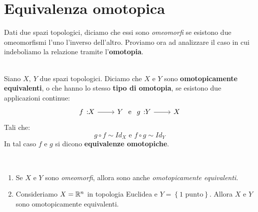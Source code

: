 \section{Equivalenza omotopica}
Dati due spazi topologici, diciamo che essi sono \textit{omeomorfi} se esistono due omeomorfismi l'uno l'inverso dell'altro. Proviamo ora ad analizzare il caso in cui indeboliamo la relazione tramite l'\textbf{omotopia}.
\begin{define}~{}\\
	Siano $X,\ Y$ due spazi topologici. Diciamo che $X$ e $Y$ sono \textbf{omotopicamente equivalenti}, o che hanno lo stesso \textbf{tipo di omotopia}, se esistono due applicazioni continue:
	\begin{equation}
		\funz{f}{X}{Y}\text{ e }\funz{g}{Y}{X}
	\end{equation}
Tali che:
\begin{equation}
	g\circ f\sim Id_X\text{ e }f\circ g\sim Id_Y
\end{equation}
In tal caso $f$ e $g$ si dicono \textbf{equivalenze omotopiche}.
\end{define}
\begin{observes}~{}
\begin{enumerate}
	\item Se $X$ e $Y$ sono \textit{omeomorfi}, allora sono anche \textit{omotopicamente equivalenti}.
	\item Consideriamo $X=\mathbb{R}^n$ in topologia Euclidea e $Y=\left\{1\text{ punto}\right\}$. Allora $X$ e $Y$ sono omotopicamente equivalenti.
\end{enumerate}
\vspace{-3mm}
\end{observes}
